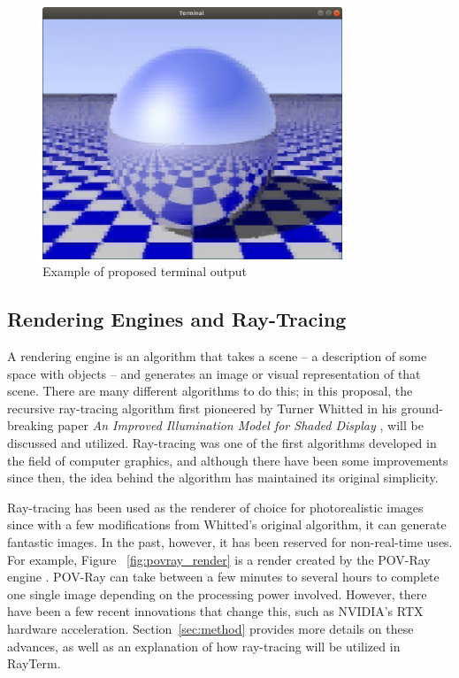 \documentclass[11pt]{article}
\newcommand{\name}{{\sc RayTerm}}
\begin{document}
\begin{figure}[htb]
  \centering
  \includegraphics[width=0.8\textwidth]{resources/checker_metal}
  \caption{Example of proposed terminal output}
  \label{fig:checker_metal}
\end{figure}

\subsection{Rendering Engines and Ray-Tracing}
\label{sec:introduction:raytracing}

A rendering engine is an algorithm that takes a scene -- a description of some space with objects -- and generates an image or visual representation of that scene.
There are many different algorithms to do this; in this proposal, the recursive ray-tracing algorithm first pioneered by Turner Whitted in his ground-breaking paper {\it An Improved Illumination Model for Shaded Display} \cite{whitted1980improved}, will be discussed and utilized.
Ray-tracing was one of the first algorithms developed in the field of computer graphics, and although there have been some improvements since then, the idea behind the algorithm has maintained its original simplicity.

Ray-tracing has been used as the renderer of choice for photorealistic images since with a few modifications from Whitted's original algorithm, it can generate fantastic images.
In the past, however, it has been reserved for non-real-time uses.
For example, Figure ~\ref{fig:povray_render} is a render created by the POV-Ray engine \cite{povray}.
POV-Ray can take between a few minutes to several hours to complete one single image depending on the processing power involved.
However, there have been a few recent innovations that change this, such as NVIDIA's RTX hardware acceleration.
Section~\ref{sec:method} provides more details on these advances, as well as an explanation of how ray-tracing will be utilized in \name.
\end{document}
